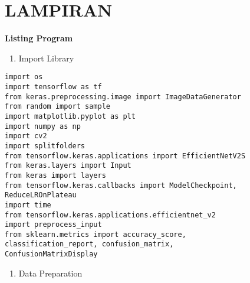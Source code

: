 \chapter*{LAMPIRAN}

\setcounter{page}{1}
\renewcommand{\thepage}{L-\arabic{page}}

\noindent
\textbf{Listing Program}
\begin{enumerate}[label=\alph*.]
    \item Import Library
\end{enumerate}

\begin{lstlisting}[style=customc]
import os
import tensorflow as tf
from keras.preprocessing.image import ImageDataGenerator
from random import sample
import matplotlib.pyplot as plt
import numpy as np
import cv2
import splitfolders
from tensorflow.keras.applications import EfficientNetV2S
from keras.layers import Input
from keras import layers
from tensorflow.keras.callbacks import ModelCheckpoint, 
ReduceLROnPlateau
import time
from tensorflow.keras.applications.efficientnet_v2 
import preprocess_input
from sklearn.metrics import accuracy_score, 
classification_report, confusion_matrix, 
ConfusionMatrixDisplay
\end{lstlisting}

\begin{enumerate}[label=\alph*., start=2]
    \item Data Preparation
\end{enumerate}











